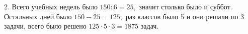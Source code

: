 2. Всего учебных недель было $150:6=25,$ значит столько было и суббот. Остальных дней было $150-25=125,$ раз классов было 5 и они решали по 3 задачи, всего было решено $125\cdot5\cdot3=1875$ задач.\\
